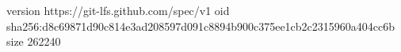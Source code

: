 version https://git-lfs.github.com/spec/v1
oid sha256:d8c69871d90c814e3ad208597d091c8894b900c375ee1cb2c2315960a404cc6b
size 262240
